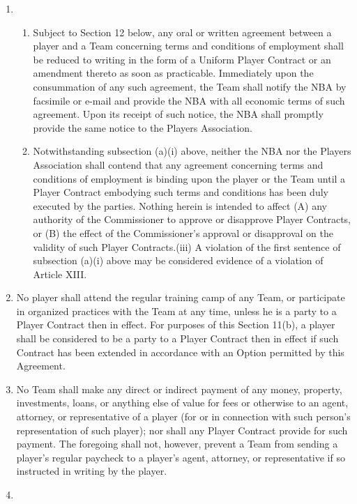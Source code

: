 \documentclass[
]{book}
\providecommand{\tightlist}{%
  \setlength{\itemsep}{0pt}\setlength{\parskip}{0pt}}
\begin{document}
\begin{enumerate}
\def\labelenumi{(\alph{enumi})}
\item
  \begin{enumerate}
  \def\labelenumii{(\roman{enumii})}
  \tightlist
  \item
    Subject to Section 12 below, any oral or written agreement between a player and a Team concerning terms and conditions of employment shall be reduced to writing in the form of a Uniform Player Contract or an amendment thereto as soon as practicable. Immediately upon the consummation of any such agreement, the Team shall notify the NBA by facsimile or e-mail and provide the NBA with all economic terms of such agreement. Upon its receipt of such notice, the NBA shall promptly provide the same notice to the Players Association.
  \item
    Notwithstanding subsection (a)(i) above, neither the NBA nor the Players Association shall contend that any agreement concerning terms and conditions of employment is binding upon the player or the Team until a Player Contract embodying such terms and conditions has been duly executed by the parties. Nothing herein is intended to affect (A) any authority of the Commissioner to approve or disapprove Player Contracts, or (B) the effect of the Commissioner's approval or disapproval on the validity of such Player Contracts.(iii) A violation of the first sentence of subsection (a)(i) above may be considered evidence of a violation of Article XIII.
  \end{enumerate}
\item
  No player shall attend the regular training camp of any Team, or participate in organized practices with the Team at any time, unless he is a party to a Player Contract then in effect. For purposes of this Section 11(b), a player shall be considered to be a party to a Player Contract then in effect if such Contract has been extended in accordance with an Option permitted by this Agreement.
\item
  No Team shall make any direct or indirect payment of any money, property, investments, loans, or anything else of value for fees or otherwise to an agent, attorney, or representative of a player (for or in connection with such person's representation of such player); nor shall any Player Contract provide for such payment. The foregoing shall not, however, prevent a Team from sending a player's regular paycheck to a player's agent, attorney, or representative if so instructed in writing by the player.
\item

\end{enumerate}
\end{document}
